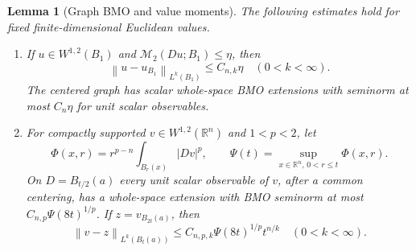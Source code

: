 \documentclass[11pt,a4paper]{article}
\numberwithin{equation}{section}
\newtheorem{lemma}[theorem]{Lemma}
\theoremstyle{definition}
\theoremstyle{remark}
\newcommand{\R}{\mathbb R}
\newcommand{\M}{\mathcal M}
\newcommand{\norm}[1]{\left\lVert#1\right\rVert}
\begin{document}
\begin{lemma}[Graph BMO and value moments]\label{lem:moments}
The following estimates hold for fixed finite-dimensional Euclidean values.
\begin{enumerate}[label=\textup{(\roman*)}]
\item If $u\in W^{1,2}(B_1)$ and $\M_2(Du;B_1)\leq\eta$, then
\begin{equation}\label{eq:critical-moments}
 \norm{u-u_{B_1}}_{L^k(B_1)}\leq C_{n,k}\eta\quad(0<k<\infty).
\end{equation}
The centered graph has scalar whole-space BMO extensions with seminorm
at most $C_n\eta$ for unit scalar observables.
\item For compactly supported $v\in W^{1,2}(\R^n)$ and $1<p<2$, let
\begin{equation}\label{eq:envelope}
 \Phi(x,r)=r^{p-n}\int_{B_r(x)}|Dv|^p,\qquad
 \Psi(t)=\sup_{x\in\R^n,\,0<r\leq t}\Phi(x,r).
\end{equation}
On $D=B_{t/2}(a)$ every unit scalar observable of $v$, after a common
centering, has a whole-space extension with BMO seminorm at most
$C_{n,p}\Psi(8t)^{1/p}$. If $z=v_{B_{2t}(a)}$, then
\begin{equation}\label{eq:local-moments}
 \norm{v-z}_{L^k(B_t(a))}
 \leq C_{n,p,k}\Psi(8t)^{1/p}t^{n/k}\quad(0<k<\infty).
\end{equation}
\end{enumerate}
\end{lemma}
\end{document}
